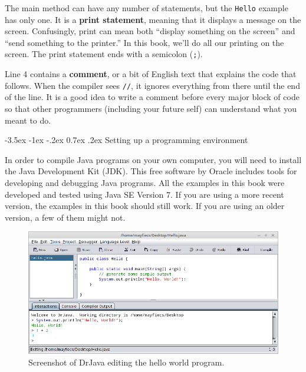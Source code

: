 \documentclass[12pt]{book}
\makeatletter
\theoremstyle{exercise}
\newcommand{\java}[1]{\verb"#1"}
\renewcommand{\section}{\@startsection {section}{1}{\z@}%
    {-3.5ex \@plus -1ex \@minus -.2ex}%
    {0.7ex \@plus.2ex}%
    {\normalfont\Large\bfseries}}
\newcommand{\java}[1]{\lstinline{#1}} %
\makeatother
\begin{document}


The main method can have any number of statements, but the \java{Hello} example has only one.
It is a {\bf print statement}, meaning that it displays a message on the screen.
Confusingly, print can mean both ``display something on the screen'' and ``send something to the printer.''
In this book, we'll do all our printing on the screen.
The print statement ends with a semicolon (\java{;}).


Line 4 contains a {\bf comment}, or a bit of English text that explains the code that follows.
When the compiler sees \java{//}, it ignores everything from there until the end of the line.
It is a good idea to write a comment before every major block of code so that other programmers (including your future self) can understand what you meant to do.


\section{Setting up a programming environment}


In order to compile Java programs on your own computer, you will need to install the Java Development Kit (JDK).
This free software by Oracle includes tools for developing and debugging Java programs.
All the examples in this book were developed and tested using Java SE Version 7.
If you are using a more recent version, the examples in this book should still work.
If you are using an older version, a few of them might not.

\begin{figure}[!h]
\begin{center}
\includegraphics[width=\textwidth]{figs/drjava-hello.png}
\caption{Screenshot of DrJava editing the hello world program.}
\end{center}
\end{figure}
\end{document}
